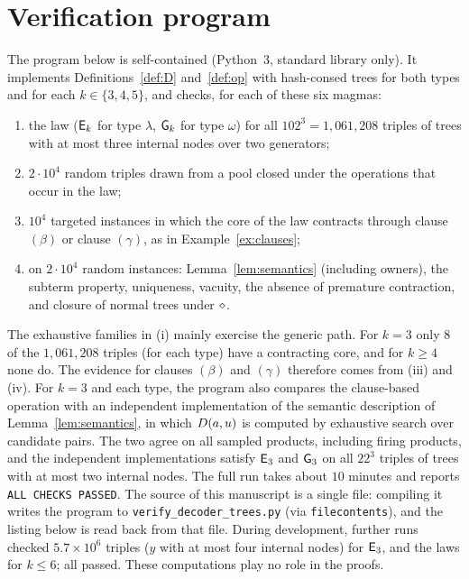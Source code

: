 \appendix
\section{Verification program}\label{app:code}

The program below is self-contained (Python~3, standard library only). It
implements Definitions~\ref{def:D} and~\ref{def:op} with hash-consed trees for
both types and for each $k\in\{3,4,5\}$, and checks, for each of these six
magmas:
\begin{enumerate}[label=(\roman*)]
\item the law ($\mathsf{E}_{k}$ for type $\lambda$, $\mathsf{G}_{k}$ for type $\omega$) for all
  $102^3=1{,}061{,}208$ triples of trees with at most three internal nodes over
  two generators;
\item $2\cdot10^4$ random triples drawn from a pool closed under the
  operations that occur in the law;
\item $10^4$ targeted instances in which the core of the law contracts through
  clause $(\beta)$ or clause $(\gamma)$, as in Example~\ref{ex:clauses};
\item on $2\cdot10^4$ random instances: Lemma~\ref{lem:semantics} (including
  owners), the subterm property, uniqueness, vacuity, the absence of premature
  contraction, and closure of normal trees under $\mathbin{\diamond}$.
\end{enumerate}
The exhaustive families in (i) mainly exercise the generic path. For $k=3$
only $8$ of the $1{,}061{,}208$ triples (for each type) have a contracting
core, and for $k\ge4$ none do. The evidence for clauses $(\beta)$ and
$(\gamma)$ therefore comes from (iii) and (iv). For $k=3$ and each type, the
program also compares the clause-based operation with an
independent implementation of the semantic description of
Lemma~\ref{lem:semantics}, in which $D(a,u)$ is computed by exhaustive
search over candidate pairs. The two agree on all sampled products, including
firing products, and the independent implementations satisfy $\mathsf{E}_{3}$ and
$\mathsf{G}_{3}$ on all $22^3$ triples of trees with at most two internal nodes. The
full run takes about $10$ minutes and reports \texttt{ALL CHECKS PASSED}. The
source of this manuscript is a single file: compiling it writes the program to
\texttt{verify\_decoder\_trees.py} (via \texttt{filecontents}), and the listing
below is read back from that file. During development, further runs checked
$5.7\times10^6$ triples ($y$ with at most four internal nodes) for $\mathsf{E}_{3}$, and
the laws for $k\le6$; all passed. These computations play no role in the
proofs.




